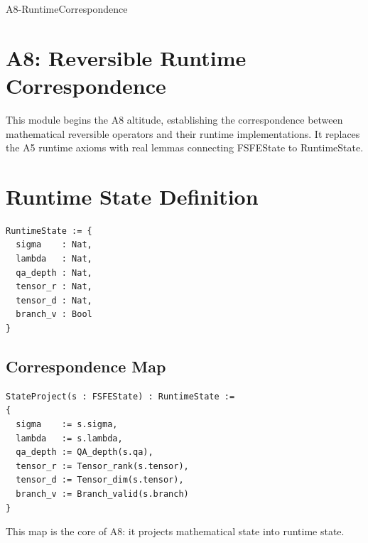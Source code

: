 \documentclass[11pt]{article}
\begin{document}


\begin{citationmembrane}{A8-RuntimeCorrespondence}
\end{citationmembrane}

\section*{A8: Reversible Runtime Correspondence}

This module begins the A8 altitude, establishing the correspondence between
mathematical reversible operators and their runtime implementations. It replaces
the A5 runtime axioms with real lemmas connecting FSFEState to RuntimeState.

\newpage


\section{Runtime State Definition}

\begin{verbatim}
RuntimeState := {
  sigma    : Nat,
  lambda   : Nat,
  qa_depth : Nat,
  tensor_r : Nat,
  tensor_d : Nat,
  branch_v : Bool
}
\end{verbatim}

\subsection{Correspondence Map}

\begin{verbatim}
StateProject(s : FSFEState) : RuntimeState :=
{
  sigma    := s.sigma,
  lambda   := s.lambda,
  qa_depth := QA_depth(s.qa),
  tensor_r := Tensor_rank(s.tensor),
  tensor_d := Tensor_dim(s.tensor),
  branch_v := Branch_valid(s.branch)
}
\end{verbatim}

This map is the core of A8: it projects mathematical state into runtime state.
\end{document}
